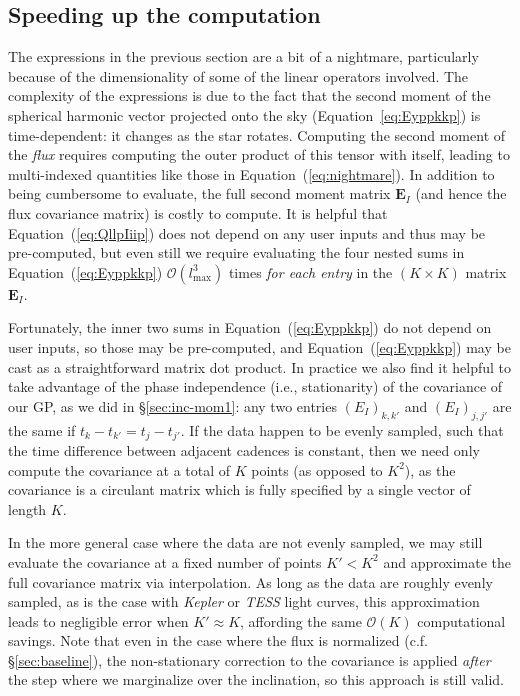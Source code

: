 \documentclass[modern]{aastex62}
\begin{document}
\subsection{Speeding up the computation}
\label{sec:inc-speedup}
%
The expressions in the previous section are a bit of a nightmare,
particularly because of the dimensionality of some of the linear
operators involved. The complexity of the expressions is due to
the fact that the second moment of the spherical harmonic vector
projected onto the sky (Equation~\ref{eq:Eyppkkp}) is time-dependent:
it changes as the star rotates. Computing the second moment of the
\emph{flux} requires computing the outer product of this tensor
with itself, leading to multi-indexed quantities like those in
Equation~(\ref{eq:nightmare}). In addition to being cumbersome to
evaluate, the full second moment matrix $\mathbf{E}_I$
(and hence the flux covariance matrix) is costly to compute.
It is helpful that Equation~(\ref{eq:QllpIiip}) does not depend
on any user inputs and thus may be pre-computed, but even still
we require evaluating the four nested sums
in Equation~(\ref{eq:Eyppkkp})
$\mathcal{O}(l_\mathrm{max}^3)$ times
\emph{for each entry} in the $(K \times K)$ matrix $\mathbf{E}_I$.

Fortunately, the inner two sums in Equation~(\ref{eq:Eyppkkp})
do not depend on user inputs, so those may be pre-computed,
and Equation~(\ref{eq:Eyppkkp}) may be cast as a straightforward
matrix dot product. In practice we also find it helpful to
take advantage of the phase independence (i.e., stationarity)
of the covariance of our GP, as we did in \S\ref{sec:inc-mom1}:
any two entries $(E_I)_{k,k'}$ and $(E_I)_{j,j'}$ are
the same if $t_{k} - t_{k'} = t_{j} - t_{j'}$. If the data
happen to be evenly sampled, such that the time difference between
adjacent cadences is constant, then we need only compute the
covariance at a total of $K$ points (as opposed to $K^2$), as the
covariance is a circulant matrix which is fully specified by a
single vector of length $K$.

In the more general case where the data are not evenly sampled,
we may still evaluate the covariance at a fixed number of points
$K' < K^2$ and approximate the full covariance matrix via
interpolation. As long as the data are roughly evenly sampled,
as is the case with \emph{Kepler} or \emph{TESS} light curves,
this approximation leads to negligible error when $K' \approx K$,
affording the same $\mathcal{O}(K)$ computational savings.
Note that even in the case where the flux is normalized
(c.f. \S\ref{sec:baseline}), the non-stationary correction to the
covariance is applied \emph{after} the step where we marginalize
over the inclination, so this approach is still valid.
\end{document}
